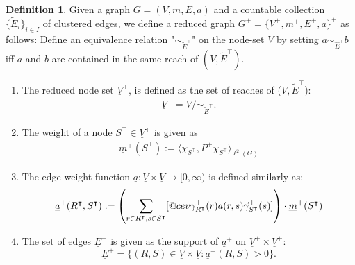 \documentclass[reqno,12pt,letterpaper]{amsart}
\makeatletter
\numberwithin{equation}{section}
\DeclareRobustCommand{\cev}[1]{%
	\mathpalette\do@cev{#1}%
}
\newcommand{\do@cev}[2]{%
	\fix@cev{#1}{+}%
	\reflectbox{$\m@th#1\vec{\reflectbox{$\fix@cev{#1}{-}\m@th#1#2\fix@cev{#1}{+}$}}$}%
	\fix@cev{#1}{-}%
}
\newcommand{\fix@cev}[2]{%
	\ifx#1\displaystyle
	\mkern#23mu
	\else
	\ifx#1\textstyle
	\mkern#23mu
	\else
	\ifx#1\scriptstyle
	\mkern#22mu
	\else
	\mkern#22mu
	\fi
	\fi
	\fi
}
\newcommand{\1}{\mathds{1}}
\theoremstyle{definition}
\newtheorem{Def}[Th]{Definition}
\makeatother
\begin{document}
\begin{Def}\label{deg_coarse_G_def} Given a graph $G = (V, m, E, a)$ and a countable collection $\{\tilde{E}_i\}_{i \in I}$ of clustered edges,
	we define a reduced graph $\underline{G}^+ = \{\underline{V}^+, \underline{m}^+, \underline{E}^+,\underline{a}\}^+$ as follows:
	Define an equivalence relation "$\sim_{\tilde{E}^\intercal}$" on the node-set $V$ by setting $a \sim_{\hat{E}^\intercal} b $ iff
	$a$ and $b$ are contained in the same reach of $(V, \tilde{E}^\intercal)$.
	\begin{enumerate}[label=(\roman*), topsep=0pt, itemsep=-.2em]
		\item 	The reduced node set $\underline{V}^+$, is defined as the set of reaches of ($V, \tilde{E}^\intercal$):
		\begin{align}
			\underline{V}^+ = V/ \sim_{\tilde{E}^\intercal}.
		\end{align}
		\item The weight of a node $S^\intercal \in \underline{V}^+$ is given as
		\begin{align}\label{out_deg_mass}
			\underline{m}^+(S^\intercal) := 	\langle  \chi_{S^\intercal} ,P^+  \chi_{S^\intercal}  \rangle_{\ell^2(G)}
		\end{align}
		\item The edge-weight function $\underline{a}:\underline{V} \times \underline{V} \rightarrow [0, \infty)$ is defined similarly as:
		\begin{align}\label{weight_def_+}
			\underline{a}^+(R^\intercal, S^\intercal) := \left(\sum\limits_{r \in R^\intercal, s \in S^\intercal} 
			[
			\cev{\gamma}^{+}_{R^\intercal}(r)
			a(r,s)
			\vec{\gamma}_{S^\intercal}^{+}(s)
			]\right) \cdot \underline{m}^+(S^\intercal)
		\end{align}
		\item The set of edges $\underline{E}^+$ is given as the support of $\underline{a}^+$ on $\underline{V}^+ \times \underline{V}^+$:
		\begin{equation}
			\underline{E}^+ = \{(R,S)\in\underline{V}\times\underline{V}: \underline{a}^+(R,S) >0 \}.
		\end{equation}
	\end{enumerate}
\end{Def}

\medskip
\end{document}
